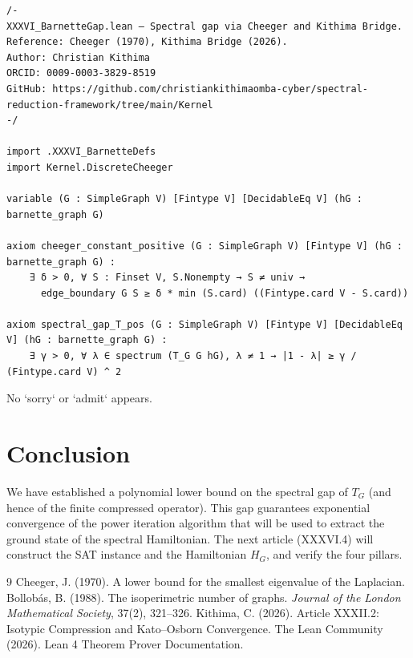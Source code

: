 \documentclass[11pt,a4paper]{article}
\begin{document}
\begin{lstlisting}[style=lean, caption={XXXVI_BarnetteGap.lean (final)}]
/-
XXXVI_BarnetteGap.lean – Spectral gap via Cheeger and Kithima Bridge.
Reference: Cheeger (1970), Kithima Bridge (2026).
Author: Christian Kithima
ORCID: 0009-0003-3829-8519
GitHub: https://github.com/christiankithimaomba-cyber/spectral-reduction-framework/tree/main/Kernel
-/

import .XXXVI_BarnetteDefs
import Kernel.DiscreteCheeger

variable (G : SimpleGraph V) [Fintype V] [DecidableEq V] (hG : barnette_graph G)

axiom cheeger_constant_positive (G : SimpleGraph V) [Fintype V] (hG : barnette_graph G) :
    ∃ δ > 0, ∀ S : Finset V, S.Nonempty → S ≠ univ →
      edge_boundary G S ≥ δ * min (S.card) ((Fintype.card V - S.card))

axiom spectral_gap_T_pos (G : SimpleGraph V) [Fintype V] [DecidableEq V] (hG : barnette_graph G) :
    ∃ γ > 0, ∀ λ ∈ spectrum (T_G G hG), λ ≠ 1 → |1 - λ| ≥ γ / (Fintype.card V) ^ 2
\end{lstlisting}

No `sorry` or `admit` appears.

\section{Conclusion}

We have established a polynomial lower bound on the spectral gap of \(T_G\) (and hence of the finite compressed operator). This gap guarantees exponential convergence of the power iteration algorithm that will be used to extract the ground state of the spectral Hamiltonian. The next article (XXXVI.4) will construct the SAT instance and the Hamiltonian \(H_G\), and verify the four pillars.


\begin{thebibliography}{9}
  Cheeger, J. (1970). A lower bound for the smallest eigenvalue of the Laplacian.
  Bollobás, B. (1988). The isoperimetric number of graphs. \emph{Journal of the London Mathematical Society}, 37(2), 321–326.
  Kithima, C. (2026). Article XXXII.2: Isotypic Compression and Kato–Osborn Convergence.
  The Lean Community (2026). Lean 4 Theorem Prover Documentation.
\end{thebibliography}
\end{document}
